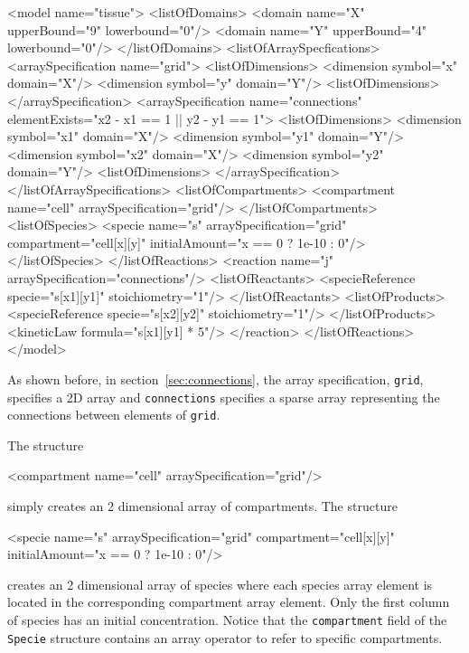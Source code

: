 \documentclass{cekarticle}
\begin{document}
\begin{example}
<model name="tissue">
    <listOfDomains>
        <domain name="X" upperBound="9" lowerbound="0"/>
        <domain name="Y" upperBound="4" lowerbound="0"/>
    </listOfDomains>
    <listOfArraySpecfications>
        <arraySpecification name="grid">
            <listOfDimensions>
                <dimension symbol="x" domain="X"/>
                <dimension symbol="y" domain="Y"/>
            <listOfDimensions>
        </arraySpecification>
        <arraySpecification
            name="connections"
            elementExists="x2 - x1 == 1 || y2 - y1 == 1">
            <listOfDimensions>
                <dimension symbol="x1" domain="X"/>
                <dimension symbol="y1" domain="Y"/>
                <dimension symbol="x2" domain="X"/>
                <dimension symbol="y2" domain="Y"/>
            <listOfDimensions>
        </arraySpecification>
    </listOfArraySpecifications>
    <listOfCompartments>
        <compartment name="cell" arraySpecification="grid"/>
    </listOfCompartments>
    <listOfSpecies>
        <specie name="s" arraySpecification="grid"
            compartment="cell[x][y]" initialAmount="x == 0 ? 1e-10 : 0"/>
    </listOfSpecies>
    </listOfReactions>
        <reaction name="j" arraySpecification="connections"/>
            <listOfReactants>
                <specieReference specie="s[x1][y1]" stoichiometry="1"/>
            </listOfReactants>
            <listOfProducts>
                <specieReference specie="s[x2][y2]" stoichiometry="1"/>
            </listOfProducts>
            <kineticLaw formula="s[x1][y1] * 5"/>
        </reaction>
    </listOfReactions>
</model>
\end{example}

As shown before, in section~\ref{sec:connections}, the array
specification, \texttt{grid}, specifies a 2D array and
\texttt{connections} specifies a sparse array representing the
connections between elements of \texttt{grid}.

The structure
\begin{example}
<compartment name="cell" arraySpecification="grid"/>
\end{example}
simply creates an 2 dimensional array of compartments.
The structure
\begin{example}
<specie name="s" arraySpecification="grid"
    compartment="cell[x][y]" initialAmount="x == 0 ? 1e-10 : 0"/>
\end{example}
creates an 2 dimensional array of species where each species
array element is located in the corresponding compartment array
element.  Only the first column of species has an initial
concentration.  Notice that the \texttt{compartment} field of the
\texttt{Specie} structure contains an array operator to refer to
specific compartments.
\end{document}
